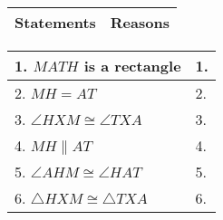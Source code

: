 \begin{tabularx}{\textwidth}{|Y|Y|}
\hline
\textbf{Statements} & \textbf{Reasons}  \\
\hline
\end{tabularx} 
\begin{tabularx}{\textwidth}{|X|X|}
\hline 
1. \(MATH\) is a rectangle & 1. \\
 \hline 
 2. \(MH = AT\) & 2. \\
 \hline
 3. $ \angle{HXM} \cong \angle{TXA} $ & 3. \\
 \hline
 4. $ MH \parallel AT $ & 4. \\
 \hline
 5. $ \angle{AHM} \cong \angle{HAT} $ & 5. \\
 \hline
 6. \(\bigtriangleup HXM \cong \bigtriangleup TXA\) & 6. \\
 \hline
\end{tabularx} 
